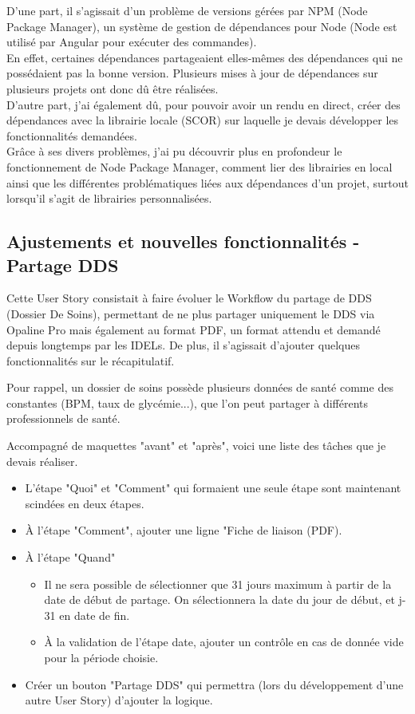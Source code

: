 \documentclass{article}
\begin{document}
D'une part, il s'agissait d'un problème de versions gérées par NPM (Node Package Manager), un système de gestion de dépendances pour Node (Node est utilisé par Angular pour exécuter des commandes). \\ En effet, certaines dépendances partageaient elles-mêmes des dépendances qui ne possédaient pas la bonne version. Plusieurs mises à jour de dépendances sur plusieurs projets ont donc dû être réalisées. \\

D'autre part, j'ai également dû, pour pouvoir avoir un rendu en direct, créer des dépendances avec la librairie locale (SCOR) sur laquelle je devais développer les fonctionnalités demandées. \\

Grâce à ses divers problèmes, j'ai pu découvrir plus en profondeur le fonctionnement de Node Package Manager, comment lier des librairies en local ainsi que les différentes problématiques liées aux dépendances d'un projet, surtout lorsqu'il s'agit de librairies personnalisées.

\newpage

\subsection{Ajustements et nouvelles fonctionnalités - Partage DDS}

Cette User Story consistait à faire évoluer le Workflow du partage de DDS (Dossier De Soins), permettant de ne plus partager uniquement le DDS via Opaline Pro mais également au format PDF, un format attendu et demandé depuis longtemps par les IDELs. De plus, il s'agissait d'ajouter quelques fonctionnalités sur le récapitulatif.

Pour rappel, un dossier de soins possède plusieurs données de santé comme des constantes (BPM, taux de glycémie...), que l'on peut partager à différents professionnels de santé.

Accompagné de maquettes "avant" et "après", voici une liste des tâches que je devais réaliser.

\begin{itemize}
    \item L'étape "Quoi" et "Comment" qui formaient une seule étape sont maintenant scindées en deux étapes.
    \item À l'étape "Comment", ajouter une ligne "Fiche de liaison (PDF).
    \item À l'étape "Quand"
    \begin{itemize}
        \item Il ne sera possible de sélectionner que 31 jours maximum à partir de la date de début de partage. On sélectionnera la date du jour de début, et j-31 en date de fin.
        \item À la validation de l'étape date, ajouter un contrôle en cas de donnée vide pour la période choisie.
    \end{itemize}
    \item Créer un bouton "Partage DDS" qui permettra (lors du développement d'une autre User Story) d'ajouter la logique.
\end{itemize}
\end{document}
